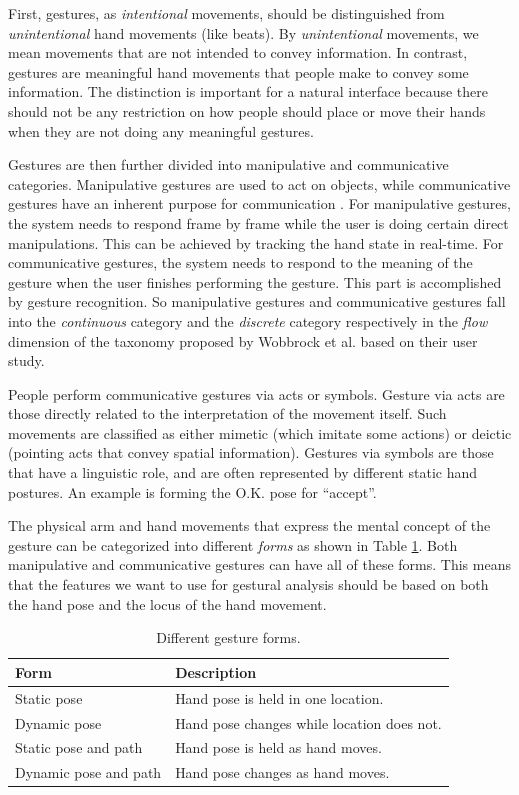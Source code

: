 First, gestures, as \textit{intentional} movements, should be distinguished from
\textit{unintentional} hand movements (like beats). By \textit{unintentional}
movements, we mean movements that are not intended to convey information. In
contrast, gestures are meaningful hand movements that people make to convey some
information. The distinction is important for a natural interface because there
should not be any restriction on how people should place or move their hands
when they are not doing any meaningful gestures. 

Gestures are then further divided into manipulative and communicative
categories. Manipulative gestures are used to act on objects, while
communicative gestures have an inherent purpose for communication
\cite{Pavlovic97}. For manipulative gestures, the system needs to respond frame by frame while the user is doing certain direct manipulations. This can be achieved by tracking the hand
state in real-time. For communicative gestures, the system needs to respond to
the meaning of the gesture when the user finishes performing the gesture. This part is
accomplished by gesture recognition. So manipulative gestures and communicative
gestures fall into the \textit{continuous} category and the
\textit{discrete} category respectively in the \textit{flow} dimension of the
taxonomy proposed by Wobbrock \cite{wobbrock09} et al. based on their
user study.

People perform communicative gestures via acts or symbols. Gesture via acts are
those directly related to the interpretation of the movement itself. Such
movements are classified as either mimetic (which imitate some actions) or
deictic (pointing acts that convey spatial information). Gestures via symbols
are those that have a linguistic role, and are often represented by different static hand postures. An example is forming the
O.K. pose for ``accept''. 

The physical arm and hand movements that express the mental concept of the
gesture can be categorized into different \textit{forms} \cite{wobbrock09} as
shown in Table \ref{tab:form}. Both manipulative and communicative gestures can
have all of these forms. This means that the features we want to use for
gestural analysis should be based on both the hand pose and the locus of the
hand movement.

\begin{table}[h]
  \centering
  \begin{tabular}{| l | l |}
  	\hline
  	\textbf{Form} 		  & \textbf{Description} \\ \hline 
  	Static pose  		  & Hand pose is held in one location. \\ \hline
  	Dynamic pose 		  & Hand pose changes while location does not. \\ \hline
  	Static pose and path  & Hand pose is held as hand moves. \\ \hline
  	Dynamic pose and path & Hand pose changes as hand moves. \\ \hline
  \end{tabular}
  \caption{Different gesture forms.}
  \label{tab:form}
\end{table}

